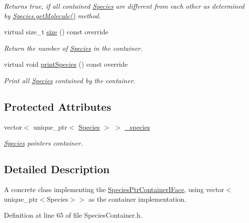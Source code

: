 \begin{DoxyCompactItemize}
\begin{DoxyCompactList}\small\item\em Returns true, if all contained \hyperlink{classSpecies}{Species} are different from each other as determined by \hyperlink{classSpecies_a1ea8969c51bc69879891a408f9e197c7}{Species.\+get\+Molecule()} method. \end{DoxyCompactList}\item 
virtual size\+\_\+t \hyperlink{classSpeciesPtrContainerVector_af7537443af8708edbb8c360a334882a2}{size} () const override
\begin{DoxyCompactList}\small\item\em Return the number of \hyperlink{classSpecies}{Species} in the container. \end{DoxyCompactList}\item 
virtual void \hyperlink{classSpeciesPtrContainerVector_ad7f746d974b5b82c25d9b7eb098c7168}{print\+Species} () const override
\begin{DoxyCompactList}\small\item\em Print all \hyperlink{classSpecies}{Species} contained by the container. \end{DoxyCompactList}\end{DoxyCompactItemize}
\subsection*{Protected Attributes}
\begin{DoxyCompactItemize}
\item 
vector$<$ unique\+\_\+ptr$<$ \hyperlink{classSpecies}{Species} $>$ $>$ \hyperlink{classSpeciesPtrContainerVector_ae47f73598325d803fcb84209bbc136cd}{\+\_\+species}
\begin{DoxyCompactList}\small\item\em \hyperlink{classSpecies}{Species} pointers container. \end{DoxyCompactList}\end{DoxyCompactItemize}


\subsection{Detailed Description}
A concrete class implementing the \hyperlink{classSpeciesPtrContainerIFace}{Species\+Ptr\+Container\+I\+Face}, using vector$<$unique\+\_\+ptr$<$\+Species$>$$>$ as the container implementation. 

Definition at line 65 of file Species\+Container.\+h.



